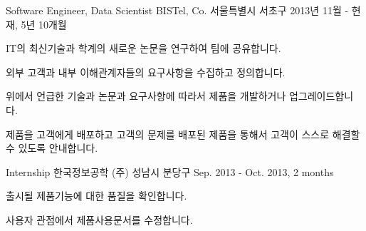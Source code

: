 

\begin{cventries}

  \cventry
    {Software Engineer, Data Scientist} %
    {BISTel, Co.} %
    {서울특별시 서초구} %
    {2013년 11월 - 현재, 5년 10개월} %
    {
      \begin{cvitems} %
        \item {IT의 최신기술과 학계의 새로운 논문을 연구하여 팀에 공유합니다.}
        \item {외부 고객과 내부 이해관계자들의 요구사항을 수집하고 정의합니다.}
        \item {위에서 언급한 기술과 논문과 요구사항에 따라서 제품을 개발하거나 업그레이드합니다.}
        \item {제품을 고객에게 배포하고 고객의 문제를 배포된 제품을 통해서 고객이 스스로 해결할 수 있도록 안내합니다.}
      \end{cvitems}
    }

  \cventry
    {Internship} %
    {한국정보공학 (주)} %
    {성남시 분당구} %
    {Sep. 2013 - Oct. 2013, 2 months} %
    {
      \begin{cvitems} %
        \item {출시될 제품기능에 대한 품질을 확인합니다.}
        \item {사용자 관점에서 제품사용문서를 수정합니다.}
      \end{cvitems}
    }

\end{cventries}
